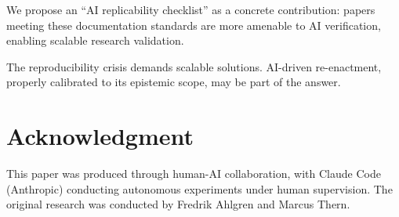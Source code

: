 \documentclass[conference]{IEEEtran}
\begin{document}
We propose an ``AI replicability checklist'' as a concrete contribution: papers meeting these documentation standards are more amenable to AI verification, enabling scalable research validation.

The reproducibility crisis demands scalable solutions. AI-driven re-enactment, properly calibrated to its epistemic scope, may be part of the answer.

\section*{Acknowledgment}

This paper was produced through human-AI collaboration, with Claude Code (Anthropic) conducting autonomous experiments under human supervision. The original research was conducted by Fredrik Ahlgren and Marcus Thern.
\end{document}
